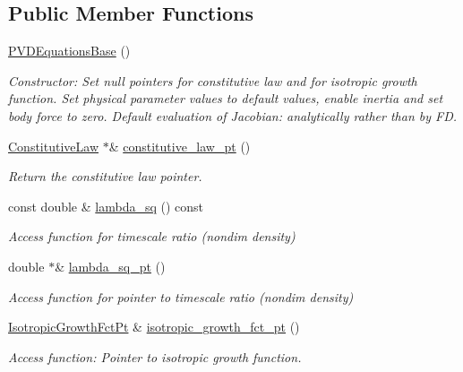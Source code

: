 \subsection*{Public Member Functions}
\begin{DoxyCompactItemize}
\item 
\hyperlink{classoomph_1_1PVDEquationsBase_aa3cbcc0a97041d72b82233311eaa53cf}{P\+V\+D\+Equations\+Base} ()
\begin{DoxyCompactList}\small\item\em Constructor\+: Set null pointers for constitutive law and for isotropic growth function. Set physical parameter values to default values, enable inertia and set body force to zero. Default evaluation of Jacobian\+: analytically rather than by FD. \end{DoxyCompactList}\item 
\hyperlink{classoomph_1_1ConstitutiveLaw}{Constitutive\+Law} $\ast$\& \hyperlink{classoomph_1_1PVDEquationsBase_a60fa403e1d80572b36dfc93f24566bde}{constitutive\+\_\+law\+\_\+pt} ()
\begin{DoxyCompactList}\small\item\em Return the constitutive law pointer. \end{DoxyCompactList}\item 
const double \& \hyperlink{classoomph_1_1PVDEquationsBase_af734fb69def2791d9b6f9a97d9aa9b8f}{lambda\+\_\+sq} () const
\begin{DoxyCompactList}\small\item\em Access function for timescale ratio (nondim density) \end{DoxyCompactList}\item 
double $\ast$\& \hyperlink{classoomph_1_1PVDEquationsBase_ae18693daa7038a22239ad468b8b83a58}{lambda\+\_\+sq\+\_\+pt} ()
\begin{DoxyCompactList}\small\item\em Access function for pointer to timescale ratio (nondim density) \end{DoxyCompactList}\item 
\hyperlink{classoomph_1_1PVDEquationsBase_a59fc7069e0330c399ff53aebb6c67729}{Isotropic\+Growth\+Fct\+Pt} \& \hyperlink{classoomph_1_1PVDEquationsBase_ab80dd7e5bf9072699faca5e2da80f66a}{isotropic\+\_\+growth\+\_\+fct\+\_\+pt} ()
\begin{DoxyCompactList}\small\item\em Access function\+: Pointer to isotropic growth function. \end{DoxyCompactList}\item 

\end{DoxyCompactItemize}
